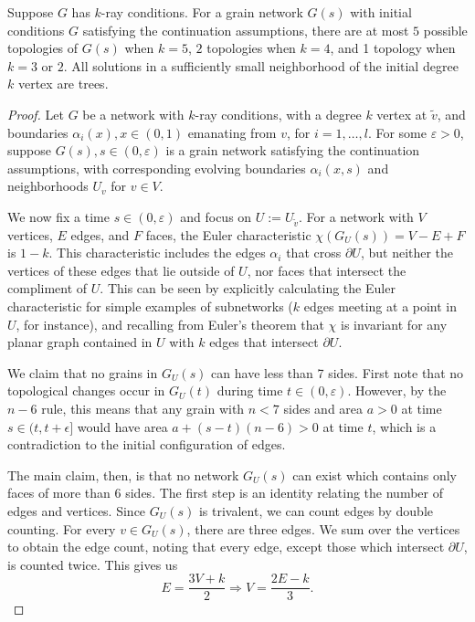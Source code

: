 \begin{theorem} Suppose $G$ has $k$-ray conditions. For a grain network $G(s)$ with initial conditions $G$ satisfying the continuation assumptions, there are at most $5$ possible topologies of $G(s)$ when $k = 5$, $2$ topologies when $k= 4$, and 1 topology when $k = 3$ or $2$. All solutions in a sufficiently small neighborhood of the initial degree $k$ vertex are trees. \end{theorem} 
\begin{proof}

  

Let $G$ be a network with $k$-ray conditions, with a  degree $k$ vertex at $\tilde v$, and boundaries $\alpha_i(x), x \in (0,1)$ emanating from $v$, for $i = 1, \dots, l$. For some $\varepsilon >0$, suppose $G(s), s \in (0,\varepsilon)$ is a grain network satisfying the continuation assumptions, with corresponding evolving boundaries $\alpha_{i}(x,s)$ and neighborhoods $U_v$ for $v \in V$. 



 We now fix a time $s\in (0,\varepsilon)$ and focus on $U:=U_{\tilde v}$.  For a network with $V$ vertices, $E$ edges, and $F$ faces,  the Euler characteristic $\chi(G_{U}(s))= V-E+F$  is $1-k$. This characteristic includes the edges $\alpha_i$ that cross $\partial U$, but neither the vertices of these edges that lie outside of $U$, nor faces that intersect the compliment of $U$. This can be seen by explicitly calculating the Euler characteristic for simple examples of subnetworks ($k$ edges meeting at a point in $U$, for instance), and recalling from Euler's theorem that  $\chi$ is invariant for any  planar graph contained in $U$ with $k$ edges that intersect $\partial U$.

We claim that no grains in $G_U(s)$ can have less than 7 sides.  First note that no topological changes occur in $G_U(t)$ during time $t \in (0,\varepsilon)$. However, by the $n-6$ rule, this means that any grain  with $n<7$ sides and area $a> 0$ at time $s\in (t,t+\epsilon]$ would have area $a+(s-t)(n-6)>0$ at time $t$, which is a contradiction to the initial configuration of edges.         
  

The main claim, then, is that no network  $G_U(s)$ can exist which contains only faces of more than 6 sides. The first step is an identity relating the number of edges and vertices.  Since $G_U(s)$ is trivalent, we can count edges by double counting. For every $v \in G_U(s)$, there are three edges. We sum over the vertices to obtain the edge count, noting that every edge, except those which intersect $\partial U$, is counted twice.  This gives us
\begin{equation} \label{vertest}
E = \frac{3V+k}{2} \Rightarrow V = \frac{2E-k}{3}.
\end{equation}


\end{proof}
